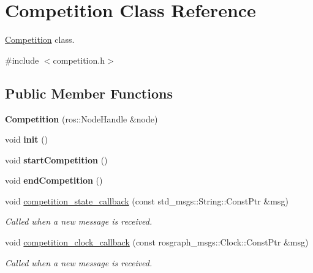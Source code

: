 \hypertarget{classCompetition}{}\section{Competition Class Reference}
\label{classCompetition}


\hyperlink{classCompetition}{Competition} class.  




{\ttfamily \#include $<$competition.\+h$>$}

\subsection*{Public Member Functions}
\begin{DoxyCompactItemize}
\item 
\mbox{\label{classCompetition_a3d8b50d07d2424bd18743148237da31c}} 
{\bfseries Competition} (ros\+::\+Node\+Handle \&node)
\item 
\mbox{\label{classCompetition_af5400538e024248fc99f83cf26ca2f23}} 
void {\bfseries init} ()
\item 
\mbox{\label{classCompetition_a2505fb69a74ff70530c033c144f7f024}} 
void {\bfseries start\+Competition} ()
\item 
\mbox{\label{classCompetition_a894a450b89f8d61d83f02f221fb1b0eb}} 
void {\bfseries end\+Competition} ()
\item 
\mbox{\label{classCompetition_a1b9545e863fc4574b29b1e43e80ebda3}} 
void \hyperlink{classCompetition_a1b9545e863fc4574b29b1e43e80ebda3}{competition\+\_\+state\+\_\+callback} (const std\+\_\+msgs\+::\+String\+::\+Const\+Ptr \&msg)
\begin{DoxyCompactList}\small\item\em Called when a new message is received. \end{DoxyCompactList}\item 
\mbox{\label{classCompetition_ae4695e5697587f7af4aa40ebae953534}} 
void \hyperlink{classCompetition_ae4695e5697587f7af4aa40ebae953534}{competition\+\_\+clock\+\_\+callback} (const rosgraph\+\_\+msgs\+::\+Clock\+::\+Const\+Ptr \&msg)
\begin{DoxyCompactList}\small\item\em Called when a new message is received. \end{DoxyCompactList}\item 

\end{DoxyCompactItemize}
